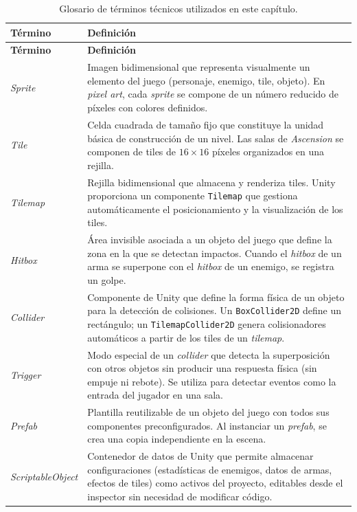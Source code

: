 {\small
\begin{longtable}{|p{}|p{}|}
\caption{Glosario de términos técnicos utilizados en este capítulo.} \\
\hline
\textbf{Término} & \textbf{Definición} \\ \hline
\endfirsthead
\hline
\textbf{Término} & \textbf{Definición} \\ \hline
\endhead
\hline
\endfoot
\hline
\endlastfoot
\textit{Sprite} & Imagen bidimensional que representa visualmente un elemento del juego (personaje, enemigo, tile, objeto). En \textit{pixel art}, cada \textit{sprite} se compone de un número reducido de píxeles con colores definidos. \\ \hline
\textit{Tile} & Celda cuadrada de tamaño fijo que constituye la unidad básica de construcción de un nivel. Las salas de \textit{Ascension} se componen de tiles de $16 \times 16$ píxeles organizados en una rejilla. \\ \hline
\textit{Tilemap} & Rejilla bidimensional que almacena y renderiza tiles. Unity proporciona un componente \texttt{Tilemap} que gestiona automáticamente el posicionamiento y la visualización de los tiles. \\ \hline
\textit{Hitbox} & Área invisible asociada a un objeto del juego que define la zona en la que se detectan impactos. Cuando el \textit{hitbox} de un arma se superpone con el \textit{hitbox} de un enemigo, se registra un golpe. \\ \hline
\textit{Collider} & Componente de Unity que define la forma física de un objeto para la detección de colisiones. Un \texttt{BoxCollider2D} define un rectángulo; un \texttt{TilemapCollider2D} genera colisionadores automáticos a partir de los tiles de un \textit{tilemap}. \\ \hline
\textit{Trigger} & Modo especial de un \textit{collider} que detecta la superposición con otros objetos sin producir una respuesta física (sin empuje ni rebote). Se utiliza para detectar eventos como la entrada del jugador en una sala. \\ \hline
\textit{Prefab} & Plantilla reutilizable de un objeto del juego con todos sus componentes preconfigurados. Al instanciar un \textit{prefab}, se crea una copia independiente en la escena. \\ \hline
\textit{ScriptableObject} & Contenedor de datos de Unity que permite almacenar configuraciones (estadísticas de enemigos, datos de armas, efectos de tiles) como activos del proyecto, editables desde el inspector sin necesidad de modificar código. \\ \hline

\end{longtable}}
